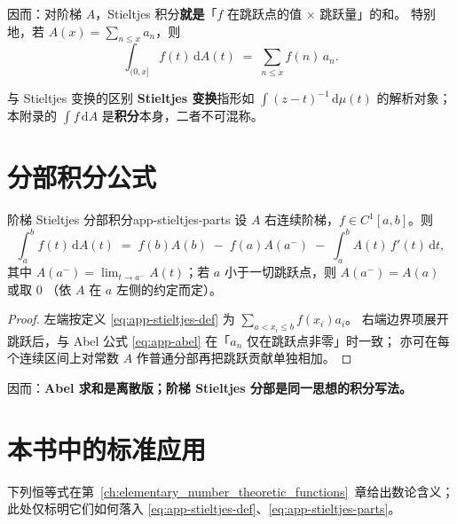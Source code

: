 因而：对阶梯 $A$，Stieltjes 积分\textbf{就是}「$f$ 在跳跃点的值 × 跳跃量」的和。
特别地，若 $A(x)=\sum_{n\le x}a_n$，则
\begin{equation}
  \int_{(0,x]} f(t)\,\mathrm{d}A(t)
  \;=\;
  \sum_{n\le x} f(n)\,a_n.
  \label{eq:app-stieltjes-sum}
\end{equation}

\begin{remark}{与 Stieltjes 变换的区别}{}
\textbf{Stieltjes 变换}指形如 $\int (z-t)^{-1}\,\mathrm{d}\mu(t)$ 的解析对象；
本附录的 $\int f\,\mathrm{d}A$ 是\textbf{积分}本身，二者不可混称。
\end{remark}

\section{分部积分公式}
\label{sec:app-stieltjes-parts}

\begin{theorem}{阶梯 Stieltjes 分部积分}{app-stieltjes-parts}
设 $A$ 右连续阶梯，$f\in C^1[a,b]$。则
\begin{equation}
  \int_a^b f(t)\,\mathrm{d}A(t)
  \;=\;
  f(b)A(b)
  \;-\;
  f(a)A(a^-)
  \;-\;
  \int_a^b A(t)\,f'(t)\,\mathrm{d}t,
  \label{eq:app-stieltjes-parts}
\end{equation}
其中 $A(a^-)=\lim_{t\to a^-}A(t)$；若 $a$ 小于一切跳跃点，则 $A(a^-)=A(a)$ 或取 $0$
（依 $A$ 在 $a$ 左侧的约定而定）。
\end{theorem}

\begin{proof}
左端按定义 \eqref{eq:app-stieltjes-def} 为 $\sum_{a<x_i\le b}f(x_i)a_i$。
右端边界项展开跳跃后，与 Abel 公式 \eqref{eq:app-abel} 在「$a_n$ 仅在跳跃点非零」时一致；
亦可在每个连续区间上对常数 $A$ 作普通分部再把跳跃贡献单独相加。
\end{proof}

因而：\textbf{Abel 求和是离散版；阶梯 Stieltjes 分部是同一思想的积分写法。}

\section{本书中的标准应用}
\label{sec:app-abel-stieltjes-apps}

下列恒等式在第~\ref{ch:elementary_number_theoretic_functions}~章给出数论含义；
此处仅标明它们如何落入 \eqref{eq:app-stieltjes-def}、\eqref{eq:app-stieltjes-parts}。

